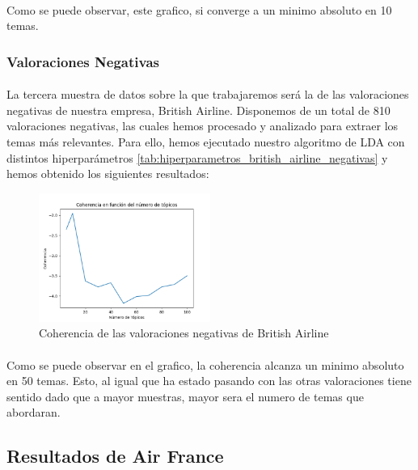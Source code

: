 \documentclass{report}
\begin{document}
{{                    \paragraph*{}{
                        Como se puede observar, este grafico, si converge a un minimo absoluto en 10 temas.
                    }
                \clearpage\subsubsection*{Valoraciones Negativas}
                    \paragraph*{}{
                        La tercera muestra de datos sobre la que trabajaremos será la de las valoraciones negativas de nuestra empresa, British Airline.
                        Disponemos de un total de 810 valoraciones negativas, las cuales hemos procesado y analizado para extraer los temas más relevantes.
                        Para ello, hemos ejecutado nuestro algoritmo de LDA con distintos hiperparámetros \ref{tab:hiperparametros_british_airline_negativas} y hemos obtenido los siguientes resultados:
                    }
                    \begin{figure}[H]
                        \centering
                        \includegraphics[width=0.5\textwidth]{./img/british_airline_negativas.png}
                        \caption{Coherencia de las valoraciones negativas de British Airline}
                    \end{figure}
                    \paragraph*{}{
                        Como se puede observar en el grafico, la coherencia alcanza un minimo absoluto en 50 temas.
                        Esto, al igual que ha estado pasando con las otras valoraciones tiene sentido dado que a mayor muestras, mayor sera el numero de temas que abordaran.
                    }
            \clearpage\subsection{Resultados de Air France}
}}
\end{document}
